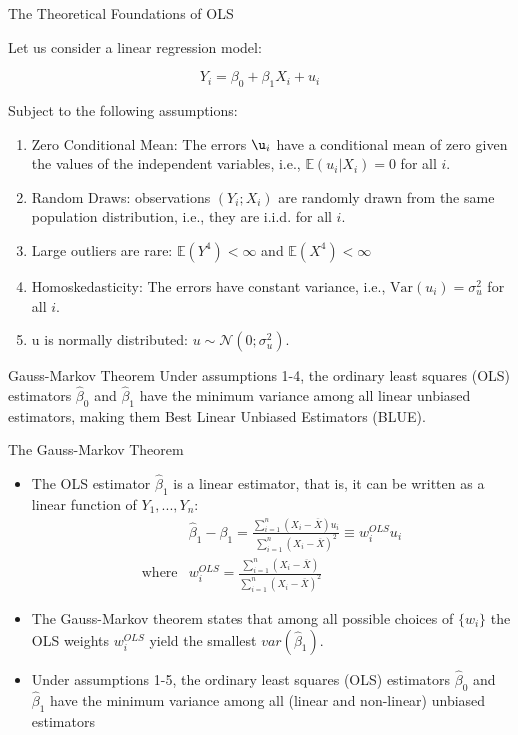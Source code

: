\documentclass[notes,10pt, aspectratio=169]{beamer}
\begin{document}
\begin{frame}{The Theoretical Foundations of OLS}

Let us consider a linear regression model:

\[
Y_i = \beta_0 + \beta_1 X_{i}  + u_i
\]

Subject to the following assumptions:

\begin{enumerate}
    \item Zero Conditional Mean: The errors $\u_i$ have a conditional mean of zero given the values of the independent variables, i.e., $\mathbb{E}(u_i|X_{i}) = 0$ for all $i$.

    \item Random Draws: observations $(Y_i;X_i)$ are randomly drawn from the same population distribution, i.e., they are i.i.d. for all $i$.
    
    \item Large outliers are rare: $\mathbb{E}(Y^4)<\infty$ and $\mathbb{E}(X^4)<\infty$
    
    \item Homoskedasticity: The errors have constant variance, i.e., $\text{Var}(u_i) = \sigma_u^2$ for all $i$.
    
    \item u is normally distributed: $u\sim\mathcal{N}(0;\sigma_u^2)$.
\end{enumerate}

\begin{exampleblock}{Gauss-Markov Theorem}
Under assumptions 1-4, the ordinary least squares (OLS) estimators $\hat{\beta}_0$ and $\hat{\beta}_1$  have the minimum variance among all linear unbiased estimators, making them Best Linear Unbiased Estimators (BLUE).
\end{exampleblock}
\end{frame}

\begin{frame}{The Gauss-Markov Theorem}
\begin{itemize}
    \item The OLS estimator $\hat{\beta}_1$ is a linear estimator, that is, it can be written as a linear function of $Y_1, ..., Y_n$:
    \begin{eqnarray*}
        &\hat{\beta}_1-\beta_1 = \frac{\sum_{i=1}^n (X_i - \overline{X})u_i}{\sum_{i=1}^n(X_i - \overline{X})^2}\equiv w^{OLS}_iu_i\\
        \text{where} &w^{OLS}_i=\frac{\sum_{i=1}^n (X_i - \overline{X})}{\sum_{i=1}^n(X_i - \overline{X})^2}
    \end{eqnarray*}
    \item The Gauss-Markov theorem states that among all possible choices of $\{w_i\}$ the OLS weights $w^{OLS}_i$ yield the smallest $var(\hat{\beta}_1)$.
    \item Under assumptions 1-5, the ordinary least squares (OLS) estimators $\hat{\beta}_0$ and $\hat{\beta}_1$  have the minimum variance among all (linear and non-linear) unbiased estimators
\end{itemize}
\end{frame}
\end{document}
